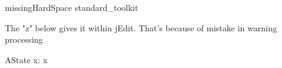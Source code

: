 
\begin{zsection}
   \SECTION missingHardSpace \parents standard\_toolkit
\end{zsection}

The "z" below gives it within jEdit. That's because of mistake in warning processing
\begin{schema}{AState}
   x: \power \nat  %
\where
  x \neq \emptyset
\end{schema}

